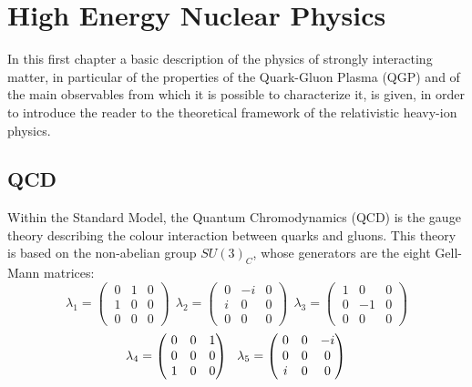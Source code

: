 \chapter{High Energy Nuclear Physics}
%
In this first chapter a basic description of the physics of strongly interacting matter, in particular of the properties of the Quark-Gluon Plasma (QGP) and of the main observables from which it is possible to characterize it, is given, in order to introduce the reader to the theoretical framework of the relativistic heavy-ion physics.
%
\section{QCD}
Within the Standard Model, the Quantum Chromodynamics (QCD) is the gauge theory describing the colour interaction between quarks and gluons. This theory is based on the non-abelian group $SU(3)_{C}$, whose generators are the eight Gell-Mann matrices:
%
\begin{equation*}
\lambda_{1} = 
  \begin{pmatrix}
     \ 0 & 1 & 0 \\
     \ 1 & 0 & 0 \\
     \ 0 & 0 & 0
   \end{pmatrix}
\ \ \lambda_{2} = 
  \begin{pmatrix}
     \ 0 & -i & 0 \\
     \ i & 0 & 0 \\
     \ 0 & 0 & 0
   \end{pmatrix}
\ \ \lambda_{3} = 
  \begin{pmatrix}
     \ 1 & 0 & 0 \\
     \ 0 & -1 & 0 \\
     \ 0 & 0 & 0
   \end{pmatrix}
\end{equation*}
\begin{equation}
\lambda_{4} = 
  \begin{pmatrix}
     \ 0 & 0 & 1 \\
     \ 0 & 0 & 0 \\
     \ 1 & 0 & 0
   \end{pmatrix}
\ \ \lambda_{5} = 
  \begin{pmatrix}
     \ 0 & 0 & -i \\
     \ 0 & 0 & 0 \\
     \ i & 0 & 0
   \end{pmatrix}
   \\
\end{equation}
